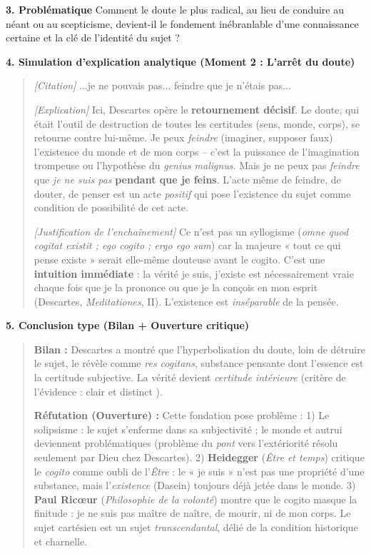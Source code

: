 \documentclass[11pt]{article}
\newcommand{\cle}[1]{{\popxbold\color{popdark}#1}}
\begin{document}
\begin{experience}
\textbf{3. Problématique}
\guillemotleft Comment le doute le plus radical, au lieu de conduire au néant ou au scepticisme, devient-il le fondement inébranlable d'une connaissance certaine et la clé de l'identité du sujet ? \guillemotright

\textbf{4. Simulation d'explication analytique (Moment 2 : L'arrêt du doute)}
\begin{quote}
\textit{[Citation]} \guillemotleft ...je ne pouvais pas... feindre que je n'étais pas... \guillemotright

\textit{[Explication]} Ici, Descartes opère le \textbf{retournement décisif}. Le doute, qui était l'outil de destruction de toutes les certitudes (sens, monde, corps), se retourne contre lui-même. Je peux \emph{feindre} (imaginer, supposer faux) l'existence du monde et de mon corps -- c'est la puissance de l'imagination trompeuse ou l'hypothèse du \emph{genius malignus}. Mais je ne peux pas \emph{feindre} que \emph{je ne suis pas} \textbf{pendant que je feins}. L'acte même de feindre, de douter, de penser est un acte \emph{positif} qui pose l'existence du sujet comme condition de possibilité de cet acte.

\textit{[Justification de l'enchaînement]} Ce n'est pas un syllogisme (\emph{omne quod cogitat existit ; ego cogito ; ergo ego sum}) car la majeure « tout ce qui pense existe » serait elle-même douteuse avant le cogito. C'est une \textbf{intuition immédiate} : la vérité \guillemotleft je suis, j'existe \guillemotright est \guillemotleft nécessairement vraie chaque fois que je la prononce ou que je la conçois en mon esprit \guillemotright (Descartes, \emph{Meditationes}, II). L'existence est \emph{inséparable} de la pensée.
\end{quote}

\textbf{5. Conclusion type (Bilan + Ouverture critique)}
\begin{quote}
\textbf{Bilan :} Descartes a montré que l'hyperbolisation du doute, loin de détruire le sujet, le révèle comme \emph{res cogitans}, substance pensante dont l'essence est la certitude subjective. La vérité devient \emph{certitude intérieure} (critère de l'évidence : \guillemotleft clair et distinct \guillemotright).

\textbf{Réfutation (Ouverture) :} Cette fondation pose problème : 1) Le \cle{solipsisme} : le sujet s'enferme dans sa subjectivité ; le monde et autrui deviennent problématiques (problème du \emph{pont} vers l'extériorité résolu seulement par Dieu chez Descartes). 2) \textbf{Heidegger} (\emph{Être et temps}) critique le \emph{cogito} comme oubli de l'\emph{Être} : le « je suis » n'est pas une propriété d'une substance, mais l'\emph{existence} (Dasein) toujours déjà jetée dans le monde. 3) \textbf{Paul Ricœur} (\emph{Philosophie de la volonté}) montre que le cogito masque la \cle{finitude} : je ne suis pas maître de naître, de mourir, ni de mon corps. Le sujet cartésien est un sujet \emph{transcendantal}, délié de la condition historique et charnelle.
\end{quote}
\end{experience}
\end{document}

